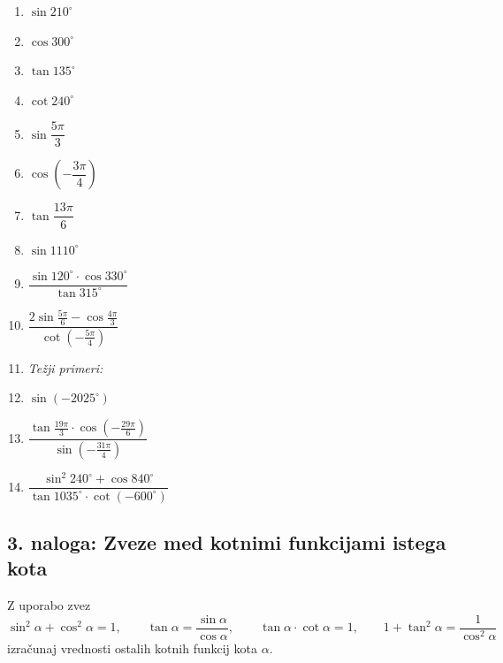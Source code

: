 \documentclass[11pt,a4paper]{article}
\newcommand{\naloga}[1]{\subsection*{#1}}
\begin{document}
\begin{enumerate}[label=\alph*), itemsep=8pt]
  \item $\sin 210^\circ$
  \item $\cos 300^\circ$
  \item $\tan 135^\circ$
  \item $\cot 240^\circ$
  \item $\sin \dfrac{5\pi}{3}$
  \item $\cos\left(-\dfrac{3\pi}{4}\right)$
  \item $\tan \dfrac{13\pi}{6}$
  \item $\sin 1110^\circ$
  \item $\dfrac{\sin 120^\circ \cdot \cos 330^\circ}{\tan 315^\circ}$
  \item $\dfrac{2\sin \frac{5\pi}{6} - \cos \frac{4\pi}{3}}{\cot\left(-\frac{5\pi}{4}\right)}$
  \item[] \textit{Težji primeri:}
  \item $\sin(-2025^\circ)$
  \item $\dfrac{\tan\frac{19\pi}{3}\cdot\cos\left(-\frac{29\pi}{6}\right)}{\sin\left(-\frac{31\pi}{4}\right)}$
  \item $\dfrac{\sin^2 240^\circ + \cos 840^\circ}{\tan 1035^\circ\cdot\cot(-600^\circ)}$
\end{enumerate}

\naloga{3. naloga: Zveze med kotnimi funkcijami istega kota}

Z uporabo zvez
\[
\sin^2\alpha + \cos^2\alpha = 1, \qquad
\tan\alpha = \frac{\sin\alpha}{\cos\alpha}, \qquad
\tan\alpha\cdot\cot\alpha = 1, \qquad
1+\tan^2\alpha = \frac{1}{\cos^2\alpha}
\]
izračunaj vrednosti ostalih kotnih funkcij kota $\alpha$.
\end{document}
